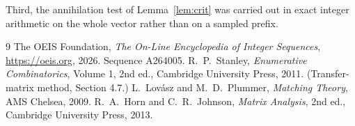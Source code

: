 \documentclass[11pt,a4paper]{article}
\theoremstyle{plain}
\theoremstyle{definition}
\begin{document}
Third, the annihilation test of Lemma~\ref{lem:crit} was carried out in exact integer
arithmetic on the whole vector rather than on a sampled prefix.

\begin{thebibliography}{9}
 The OEIS Foundation, \emph{The On-Line Encyclopedia of Integer
Sequences}, \url{https://oeis.org}, 2026. Sequence A264005.
 R.~P.~Stanley, \emph{Enumerative Combinatorics}, Volume 1, 2nd ed.,
Cambridge University Press, 2011. (Transfer-matrix method, Section 4.7.)
 L.~Lov\'asz and M.~D.~Plummer, \emph{Matching Theory}, AMS Chelsea, 2009.
 R.~A.~Horn and C.~R.~Johnson, \emph{Matrix Analysis}, 2nd ed., Cambridge
University Press, 2013.
\end{thebibliography}
\end{document}
